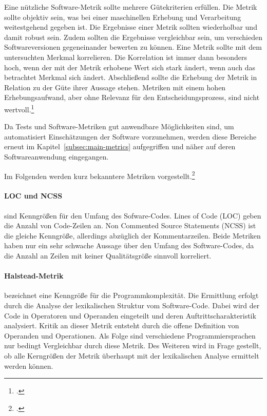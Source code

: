 Eine nützliche Software-Metrik sollte mehrere Gütekriterien erfüllen. Die Metrik sollte objektiv sein, was bei einer maschinellen Erhebung und Verarbeitung weitestgehend gegeben ist. Die Ergebnisse einer Metrik sollten wiederholbar und damit robust sein. Zudem sollten die Ergebnisse vergleichbar sein, um verschieden Softwareversionen gegeneinander bewerten zu können. Eine Metrik sollte mit dem untersuchten Merkmal korrelieren. Die Korrelation ist immer dann besonders hoch, wenn der mit der Metrik erhobene Wert sich stark ändert, wenn auch das betrachtet Merkmal sich ändert. Abschließend sollte die Erhebung der Metrik in Relation zu der Güte ihrer Aussage stehen. Metriken mit einem hohen Erhebungsaufwand, aber ohne Relevanz für den Entscheidungsprozess, sind nicht wertvoll.\footcite[S.248 ff][]{software-quality2008}

Da Tests und Software-Metriken gut anwendbare Möglichkeiten sind, um automatisiert Einschätzungen der Software vorzunehmen, werden diese Bereiche erneut im Kapitel~\ref{subsec:main-metrics} aufgegriffen und näher auf deren Softwareanwendung eingegangen.

Im Folgenden werden kurz bekanntere Metriken vorgestellt.\footcite[S.249 ff][]{software-quality2008}

\paragraph{LOC und NCSS} sind Kenngrößen für den Umfang des Sofware-Codes. \glqq Lines of Code\grqq{} (LOC) geben die Anzahl von Code-Zeilen an. \glqq Non Commented Source Statements\grqq{} (NCSS) ist die gleiche Kenngröße, allerdings abzüglich der Kommentarzeilen. Beide Metriken haben nur ein sehr schwache Aussage über den Umfang des Software-Codes, da die Anzahl an Zeilen mit keiner Qualitätsgröße sinnvoll korreliert.

\paragraph{Halstead-Metrik} bezeichnet eine Kenngröße für die Programmkomplexität. Die Ermittlung erfolgt durch die Analyse der lexikalischen Struktur vom Software-Code. Dabei wird der Code in Operatoren und Operanden eingeteilt und deren Auftrittscharakteristik analysiert. Kritik an dieser Metrik entsteht durch die offene Definition von Operanden und Operationen. Als Folge sind verschiedene Programmiersprachen nur bedingt Vergleichbar durch diese Metrik. Des Weiteren wird in Frage gestellt, ob alle Kerngrößen der Metrik überhaupt mit der lexikalischen Analyse ermittelt werden können.

